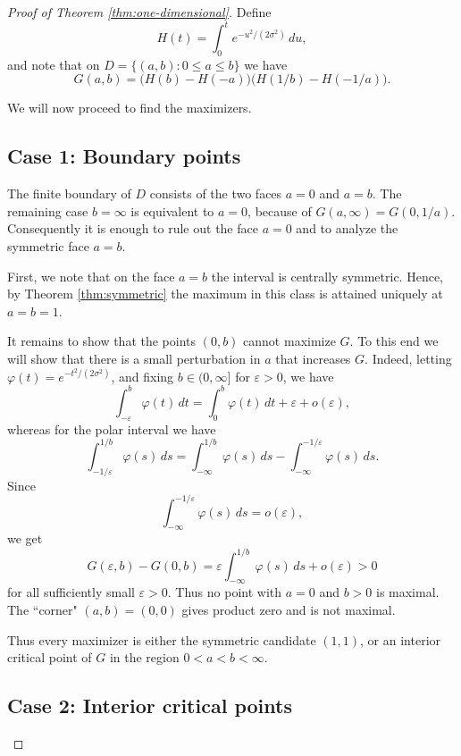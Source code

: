 \documentclass[12pt,oneside,reqno]{amsart}
\numberwithin{equation}{section}
\theoremstyle{remark}
\newcommand{\dd}{\,d}
\begin{document}
\begin{proof}[Proof of Theorem \ref{thm:one-dimensional}]

Define
\[
        H(t)=\int_0^t e^{-u^2/(2\sigma^2)}\dd u,
\]
and note that on $D=\{(a,b):0\le a\le b\}$ we have
\[
        G(a,b)=\bigl(H(b)-H(-a)\bigr)\bigl(H(1/b)-H(-1/a)\bigr).
\]

We will now proceed to find the maximizers.

\subsection*{Case 1: Boundary points}
The finite boundary of $D$ consists of the two faces \(a=0\) and
\(a=b\). The remaining case \(b=\infty\)  is equivalent to \(a=0\), because of $G(a,\infty)=G(0,1/a)$. Consequently it is enough to rule out the face \(a=0\) and to analyze the
symmetric face \(a=b\).


First, we note that on the face $a=b$  the interval is centrally symmetric. Hence, by Theorem \ref{thm:symmetric} the maximum in this class is attained uniquely at $a=b=1$.  

It remains to show that the points $(0,b)$ cannot maximize $G$. To this end we will show that there is a small perturbation in $a$ that increases $G$. Indeed, letting \(\varphi(t)=e^{-t^2/(2\sigma^2)}\), and fixing \(b\in(0,\infty]\) for
\(\varepsilon>0\), we have
\[
\int_{-\varepsilon}^{b}\varphi(t)\,dt
=
\int_{0}^{b}\varphi(t)\,dt+\varepsilon+o(\varepsilon),
\]
whereas for the polar interval we have
\[
\int_{-1/\varepsilon}^{1/b}\varphi(s)\,ds
=
\int_{-\infty}^{1/b}\varphi(s)\,ds
-
\int_{-\infty}^{-1/\varepsilon}\varphi(s)\,ds.
\]
Since
\[
        \int_{-\infty}^{-1/\varepsilon}\varphi(s)\,ds=o(\varepsilon),
\]
we get
\[
        G(\varepsilon,b)-G(0,b)
        =
        \varepsilon
        \int_{-\infty}^{1/b}\varphi(s)\,ds
        +o(\varepsilon)>0
\]
for all sufficiently small \(\varepsilon>0\). Thus no point with $a=0$ and $b>0$ is maximal. The ``corner" $(a,b)=(0,0)$ gives product zero and is not maximal.


Thus every maximizer is either the symmetric candidate \((1,1)\), or an
interior critical point of \(G\) in the region \(0<a<b<\infty\).

\subsection*{Case 2: Interior critical points}


\end{proof}
\end{document}
